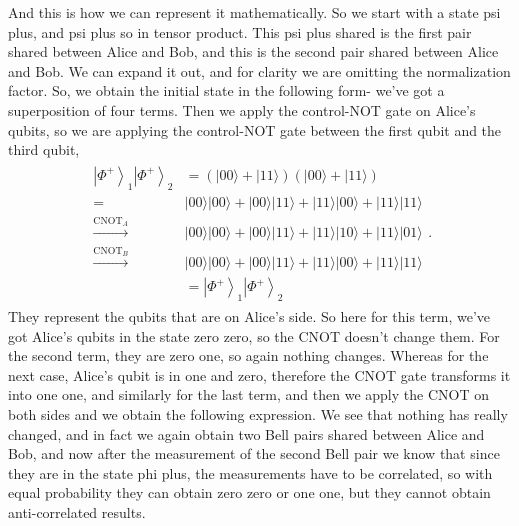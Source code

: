 And this is how we can represent it mathematically. So we start with a state psi plus, and psi plus so in tensor product. This psi plus shared is the first pair shared between Alice and Bob, and this is the second pair shared between Alice and Bob. We can expand it out, and for clarity we are omitting the normalization factor. So, we obtain the initial state in the following form- we've got a superposition of four terms. Then we apply the control-NOT gate on Alice's qubits, so we are applying the control-NOT gate between the first qubit and the third qubit,
\begin{align}
    \begin{aligned}
\left|\Phi^{+}\right\rangle_{1}\left|\Phi^{+}\right\rangle_{2} &=(|00\rangle+|11\rangle)(|00\rangle+|11\rangle) \\
=&|00\rangle|00\rangle+|00\rangle|11\rangle+|11\rangle|00\rangle+|11\rangle|11\rangle \\
\stackrel{\mathrm{CNOT}_{A}}{\longrightarrow} &|00\rangle|00\rangle+|00\rangle|11\rangle+|11\rangle|10\rangle+|11\rangle|01\rangle \\
\stackrel{\mathrm{CNOT}_{B}}{\longrightarrow} &|00\rangle|00\rangle+|00\rangle|11\rangle+|11\rangle|00\rangle+|11\rangle|11\rangle \\
&=\left|\Phi^{+}\right\rangle_{1}\left|\Phi^{+}\right\rangle_{2}
\end{aligned}.
\end{align}
They represent the qubits that are on Alice's side. So here for this term, we've got Alice's qubits in the state zero zero, so the CNOT doesn't change them. For the second term, they are zero one, so again nothing changes. Whereas for the next case, Alice's qubit is in one and zero, therefore the CNOT gate transforms it into one one, and similarly for the last term, and then we apply the CNOT on both sides and we obtain the following expression. We see that nothing has really changed, and in fact we again obtain two Bell pairs shared between Alice and Bob, and now after the measurement of the second Bell pair we know that since they are in the state phi plus, the measurements have to be correlated, so with equal probability they can obtain zero zero or one one, but they cannot obtain anti-correlated results.

